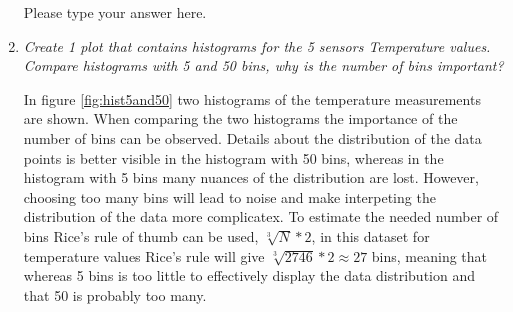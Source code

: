 \documentclass[a4paper,12pt]{article} %
\begin{document}
\begin{enumerate}
Please type your answer here.

\item {\it Create 1 plot that contains histograms for the 5 sensors Temperature values. Compare histograms with 5 and 50 bins, why is the number of bins important?}

In figure \ref{fig:hist5and50} two histograms of the temperature measurements are shown. When comparing the two histograms the importance of the number of bins can be observed. Details about the distribution of the data points is better visible in the histogram with 50 bins, whereas in the histogram with 5 bins many nuances of the distribution are lost. However, choosing too many bins will lead to noise and make interpeting the distribution of the data more complicatex. To estimate the needed number of bins Rice's rule of thumb can be used, $\sqrt[3]{{N}} * 2 $, in this dataset for temperature values Rice's rule will give $\sqrt[3]{{2746}} * 2 \approx 27 $ bins, meaning that whereas 5 bins is too little to effectively display the data distribution and that 50 is probably too many. 


\end{enumerate}
\end{document}
